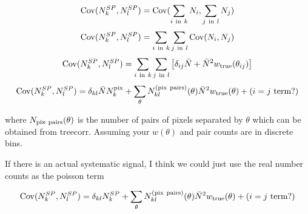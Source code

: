 \documentclass[12pt]{article}
\begin{document}
\begin{equation}
{\bf {\rm Cov}}(N^{SP}_k, N^{SP}_l) =  {\bf {\rm Cov}}( \sum_{i { \ \rm in \ } k} N_{i}, \sum_{j { \ \rm in \ } l} N_{j})
\end{equation}
\begin{equation}
{\bf {\rm Cov}}(N^{SP}_k, N^{SP}_l) =  \sum_{i { \ \rm in \ } k} \sum_{j { \ \rm in \ } l} {\bf {\rm Cov}}(N_i, N_j) 
\end{equation}
\begin{equation}
{\bf {\rm Cov}}(N^{SP}_k, N^{SP}_l) =  \sum_{i { \ \rm in \ } k} \sum_{j { \ \rm in \ } l} \left[ \delta_{ij}{\bar N} + {\bar N}^2 w_{\rm true}(\theta_{ij}) \right]
\end{equation}
\begin{equation}
{\bf {\rm Cov}}(N^{SP}_k, N^{SP}_l) =  \delta_{kl} {\bar N} N^{\rm pix}_{k} + \sum_{\theta} N^{\rm (pix \ pairs)}_{kl}(\theta) {\bar N}^2 w_{\rm true}(\theta) + {(i=j \ \rm term?)}
\end{equation}

where $N_{\rm pix \ pairs}(\theta)$ is the number of pairs of pixels separated by $\theta$ which can be obtained from treecorr. Assuming your $w(\theta)$ and pair counts are in discrete bins.

If there is an actual systematic signal, I think we could just use the real number counts as the poisson term

\begin{equation}
{\bf {\rm Cov}}(N^{SP}_k, N^{SP}_l) =  \delta_{kl} N^{SP}_{k} + \sum_{\theta} N^{\rm (pix \ pairs)}_{kl}(\theta) {\bar N}^2 w_{\rm true}(\theta) + {(i=j \ \rm term?)}
\end{equation}
\end{document}
